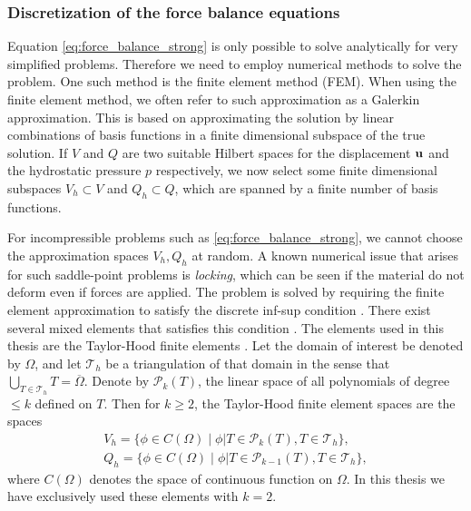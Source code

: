 \subsubsection{Discretization of the force balance equations}

Equation \eqref{eq:force_balance_strong} is only possible to solve
analytically for very simplified problems. Therefore we need to employ
numerical methods to solve the problem. One such method
is the finite element method (FEM). When using the finite element method, we often refer to such
approximation as a Galerkin approximation. This is based on
approximating the solution by linear combinations of  basis functions in a finite dimensional
subspace of the true solution. If $V$ and $Q$ are two suitable Hilbert
spaces for the displacement $\mathbf{u}$ and the hydrostatic pressure $p$
respectively, we now select some finite dimensional subspaces $V_h
\subset V$ and $Q_h \subset Q$, which are spanned by a finite number
of basis functions. 


For incompressible problems such as \eqref{eq:force_balance_strong}, we cannot choose the
approximation spaces $V_h, Q_h$ at random. A known numerical issue
that arises for such saddle-point problems is \emph{locking}, which can be
seen if the material do not deform even if forces are applied. The
problem is solved by requiring the finite element approximation to
satisfy the discrete inf-sup condition \cite{le1982existence}. There
exist several mixed elements that satisfies this condition
\cite{chapelle1993inf}. The elements used in this thesis are the
Taylor-Hood finite elements \cite{taylor1973numerical}. Let the domain of
interest be denoted by $\Omega$, and let $\mathcal{T}_h$ be a
triangulation of that domain in the sense that $\bigcup_{T \in
  \mathcal{T}_h} T = \overline{\Omega}$. Denote by $\mathcal{P}_k
(T)$, the linear space of all polynomials of degree $\leq k$ defined
on $T$. Then for $k \geq 2$, the Taylor-Hood finite element spaces are the spaces
\begin{align}
  V_h = \{  \phi \in C(\Omega) \;  | \; \phi \big| T  \in \mathcal{P}_k (T) , T \in \mathcal{T}_h \},\\
  Q_h = \{  \phi \in C(\Omega) \;  | \; \phi \big| T  \in \mathcal{P}_{k-1} (T) , T \in \mathcal{T}_h \},
\end{align}
where $C(\Omega)$ denotes the space of continuous function on
$\Omega$. In this thesis we have exclusively used these elements with
$k = 2$.



